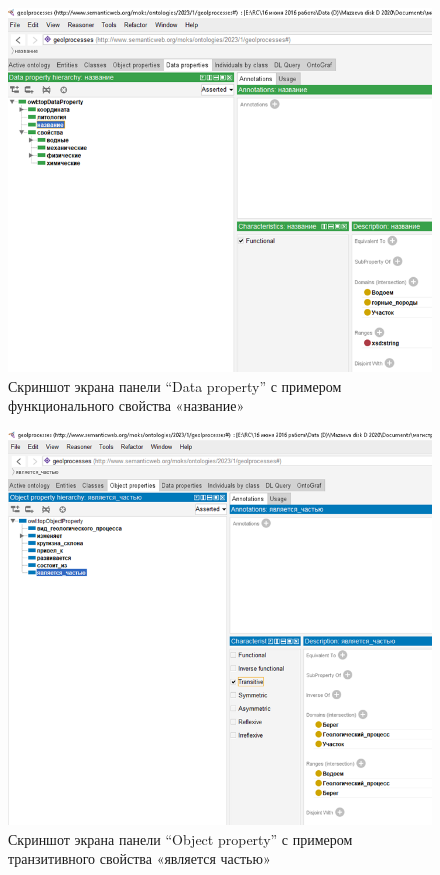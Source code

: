 \documentclass[732,fontsize=14pt,final]{studrep}
\begin{document}
  \begin{figure}[htp]
	\centering
	\includegraphics[width=0.9\linewidth]{pics/image8.png}
    \caption{Скриншот экрана панели “Data property” с примером функционального свойства «название»}
    \label{fig:data-props-name}
  \end{figure}

  \begin{figure}[htp]
	\centering
	\includegraphics[width=0.9\linewidth]{pics/image11.png}
    \caption{Скриншот экрана панели “Object property” с примером транзитивного свойства «является частью»}
    \label{fig:obj-props-trans}
  \end{figure}
\end{document}
